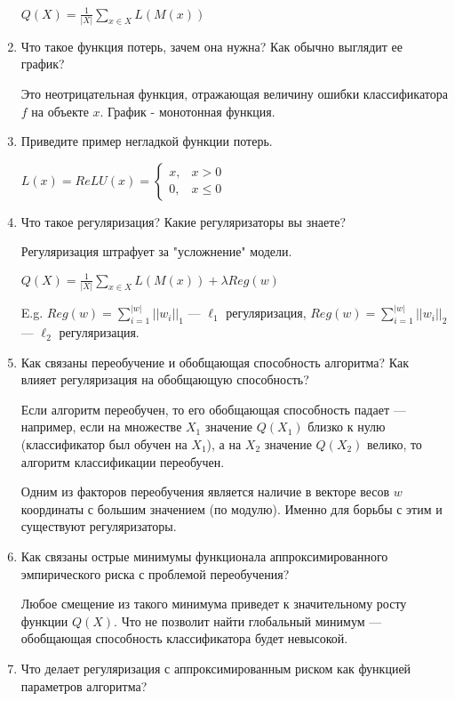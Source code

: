 \documentclass[12pt]{article}
\begin{document}
\begin{enumerate}
			$Q(X) = \frac{1}{|X|}\sum_{x \in X} L(M(x))$
			
		\item Что такое функция потерь, зачем она нужна? Как обычно выглядит ее график?
		
			Это неотрицательная функция, отражающая величину ошибки классификатора $f$ на объекте $x$. График - монотонная функция.
			
		\item Приведите пример негладкой функции потерь.

			$L(x) = ReLU(x) = \begin{cases}
				x, & x > 0 \\ 
				0, & x \leq 0
			\end{cases}$
		 
		\item Что такое регуляризация? Какие регуляризаторы вы знаете?
		
			Регуляризация штрафует за "усложнение" модели.
			
			$Q(X) = \frac{1}{|X|}\sum_{x \in X} L(M(x)) + \lambda Reg(w)$
			
			E.g. $Reg(w) = \sum_{i=1}^{|w|} ||w_i||_1$ --- $\ell_1$ регуляризация, $Reg(w) = \sum_{i=1}^{|w|} ||w_i||_2$ --- $\ell_2$ регуляризация.
			
		\item Как связаны переобучение и обобщающая способность алгоритма? Как влияет регуляризация на обобщающую способность?
		
			Если алгоритм переобучен, то его обобщающая способность падает --- например, если на множестве $X_1$ значение $Q(X_1)$ близко к нулю (классификатор был обучен на $X_1$), а на $X_2$ значение $Q(X_2)$ велико, то алгоритм классификации переобучен.
			
			Одним из факторов переобучения является наличие в векторе весов $w$ координаты с большим значением (по модулю). Именно для борьбы с этим и существуют регуляризаторы.
			
		\item Как связаны острые минимумы функционала аппроксимированного эмпирического риска с проблемой переобучения?

			Любое смещение из такого минимума приведет к значительному росту функции $Q(X)$. Что не позволит найти глобальный минимум --- обобщающая способность классификатора будет невысокой.
			
		\item Что делает регуляризация с аппроксимированным риском как функцией параметров алгоритма?
			

\end{enumerate}
\end{document}
